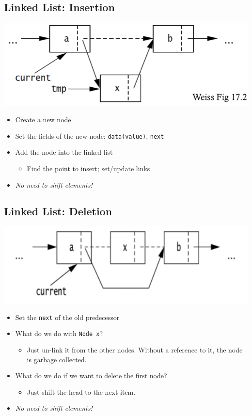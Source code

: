 \documentclass[10pt]{article}
\begin{document}
\subsection*{Linked List: Insertion}
\begin{center}
\includegraphics[width=\textwidth/4]{images/2.png}
\end{center}
\begin{itemize}
    \item Create a new node
    \item Set the fields of the new node: \texttt{data(value)}, \texttt{next}
    \item Add the node into the linked list
    \begin{itemize}
        \item Find the point to insert; set/update links
    \end{itemize}
    \item \textit{No need to shift elements!}
\end{itemize}

\subsection*{Linked List: Deletion}
\begin{center}
\includegraphics[width=\textwidth/4]{images/3.png}
\end{center}
\begin{itemize}
    \item Set the \texttt{next} of the old predecessor
    \item What do we do with \texttt{Node x}?
    \begin{itemize}
        \item Just un-link it from the other nodes. Without a reference to it, the node is garbage collected.
    \end{itemize}
    \item What do we do if we want to delete the first node?
    \begin{itemize}
        \item Just shift the head to the next item.
    \end{itemize}
    \item \textit{No need to shift elements!}
\end{itemize}
\end{document}
